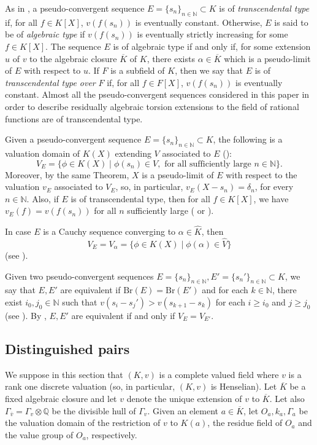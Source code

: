 \documentclass[10pt]{article}
\numberwithin{equation}{section}
\theoremstyle{definition}\newtheorem{Def}[equation]{Definition}
\theoremstyle{definition}\newtheorem{Ques}[equation]{Question}
\newcommand{\Q}{\mathbb{Q}}
\newcommand{\N}{\mathbb{N}}
\newcommand{\Br}{\text{Br}}
\newcommand{\K}{\widehat{K}}
\newcommand{\V}{\widehat{V}}
\begin{document}
As in \cite[Definitions, p. 306]{Kap}, a pseudo-convergent sequence $E=\{s_n\}_{n\in\N}\subset K$ is of \emph{transcendental type} if, for all $f\in K[X]$, $v(f(s_n))$ is eventually constant. Otherwise, $E$ is said to be of \emph{algebraic type} if $v(f(s_n))$ is eventually strictly increasing for some $f\in K[X]$. The sequence $E$ is of algebraic type if and only if, for some extension $u$ of $v$ to the algebraic closure $\overline{K}$ of $K$, there exists $\alpha\in\overline{K}$ which is a pseudo-limit of $E$ with respect to $u$. If $F$ is a subfield of $K$, then we say that $E$ is of \emph{transcendental type over} $F$ if, for all $f\in F[X]$, $v(f(s_n))$ is eventually constant. Almost all the pseudo-convergent sequences considered in this paper in order to describe residually algebraic torsion extensions to the field of rational functions are of transcendental type.

Given a pseudo-convergent sequence $E=\{s_n\}_{n\in\N}\subset K$, the following is a valuation domain of $K(X)$ extending $V$ associated to $E$ (\cite[Theorem 3.8]{PS1}):
$$V_E=\{\phi\in K(X)\mid \phi(s_n)\in V,\text{ for all sufficiently large }n\in\N\}.$$
Moreover, by the same Theorem, $X$ is a pseudo-limit of $E$  with respect to the valuation $v_E$ associated to $V_E$, so, in particular, $v_E(X-s_n)=\delta_n$, for every $n\in\N$. Also, if $E$ is of transcendental type, then for all $f\in K[X]$, we have  $v_E(f)=v(f(s_n))$ for all $n$ sufficiently large (\cite[Theorem 2]{Kap} or \cite[Theorem 4.9, a)]{PS1}).

In case $E$ is a Cauchy sequence converging to $\alpha\in\K$, then 
$$V_E=V_{\alpha}=\{\phi\in K(X)\mid \phi(\alpha)\in \V\}$$
(see \cite[Remark 3.10]{PS1}).


Given two pseudo-convergent sequences $E=\{s_n\}_{n\in\N},E'=\{s_n'\}_{n\in\N}\subset K$, we say that $E,E'$ are equivalent if $\Br(E)=\Br(E')$ and for each $k\in\N$, there exist $i_0,j_0\in\N$ such that $v(s_i-s_j')>v(s_{k+1}-s_k)$ for each $i\geq i_0$ and $j\geq j_0$  (see   \cite[\S 5]{PS1}). By \cite[Proposition 5.3]{PS2}, $E,E'$ are equivalent if and only if $V_E=V_{E'}$.

\subsection{Distinguished pairs}\label{dist and min pairs}
We suppose in this section that $(K,v)$ is a complete valued field where $v$ is a rank one discrete valuation (so, in particular, $(K,v)$ is Henselian). Let $\overline{K}$ be a fixed algebraic closure and let $v$ denote the unique extension of $v$ to $\overline{K}$. Let also $\Gamma_{\overline{v}}=\Gamma_v\otimes\Q$ be the divisible hull of $\Gamma_v$. Given an element $a\in\overline{K}$, let $O_a, k_a,\Gamma_a$ be the valuation domain of the restriction of $v$ to $K(a)$, the residue field of $O_a$ and the value group of $O_a$,   respectively.
\end{document}
